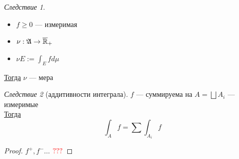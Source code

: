 \documentclass[oneside]{book}
\newcommand{\R}{\mathbb{R}}
\theoremstyle{plain}
\theoremstyle{remark}
\newtheorem{corollary}{Следствие}[theorem]
\theoremstyle{definition}
\begin{document}
\begin{corollary}
\begin{itemize}
\item \(f \ge 0\) --- измеримая
\item \(\nu: \A \to \overline{\R}_+\)
\item \(\nu E := \int_E fd\mu\)
\end{itemize}
\uline{Тогда} \(\nu\) --- мера
\end{corollary}
\begin{corollary}[аддитивности интеграла]
\(f\) --- суммируема на \(A = \bigsqcup A_i\) --- измеримые \\
\uline{Тогда} \[ \int_A f = \sum \int_{A_i} f \]
\end{corollary}
\begin{proof}
\(f^+, f^- \dots\) \(\color{red}???\)
\end{proof}
\end{document}

